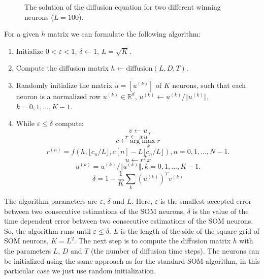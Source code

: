 \documentclass[10pt,english]{article}
\begin{document}
\begin{figure}[t!]
\centering
{}
\qquad
{}
\caption{The solution of the diffusion equation for two different winning neurons ($L=100$).}
\end{figure}

For a given $h$ matrix we can formulate the following algorithm:

\begin{enumerate}
\item Initialize $0<\varepsilon<1$, $\delta \leftarrow 1$, $L=\sqrt{K}$.
\item Compute the diffusion matrix $h \leftarrow \text{diffusion}(L,D,T)$.
\item Randomly initialize the matrix $u  =[u^{(k)}]$ of $K$ neurons, such that each neuron is a normalized row $u^{(k)} \in \mathbb{R}^d$, $u^{(k)} \leftarrow u^{(k)}/\Vert u^{(k)} \Vert$, $k=0,1,...,K-1$.
\item While $\varepsilon \leq \delta$ compute:
\begin{equation}
v \leftarrow u
\end{equation}
\begin{equation}
r \leftarrow xu^T
\end{equation}
\begin{equation}
c \leftarrow \text{arg} \max_k r
\end{equation}
\begin{equation}
r^{(n)} = f(h,\lfloor c_n/L \rfloor, c[n]-L \lfloor c_n/L \rfloor), n=0,1,...,N-1.
\end{equation}
\begin{equation}
u \leftarrow r^Tx
\end{equation}
\begin{equation}
u^{(k)} = u^{(k)}/\Vert u^{(k)} \Vert, k=0,1,...,K-1.
\end{equation}
\begin{equation}
\delta = 1 - \frac{1}{K} \sum_k (u^{(k)})^T v^{(k)}
\end{equation}
\end{enumerate}

The algorithm parameters are $\varepsilon$, $\delta$ and $L$. Here, $\varepsilon$ is the smallest accepted error between two consecutive estimations of the SOM neurons, $\delta$ is the value of the time dependent error between two consecutive estimations of the SOM neurons. So, the algorithm runs until $\varepsilon \leq \delta$. $L$ is the length of the side of the square grid of SOM neurons, $K=L^2$. 
The next step is to compute the diffusion matrix $h$ with the parameters $L$, $D$ and $T$ (the number of diffusion time steps).
The neurons can be initialized using the same approach as for the standard SOM algorithm, in this particular case we just use random initialization. 
\end{document}
